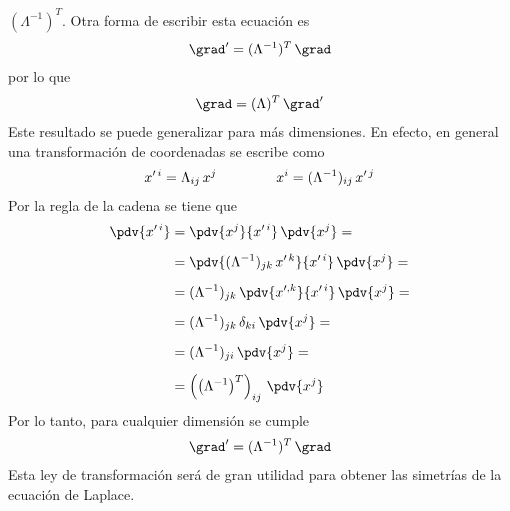 $(\Lambda^{-1})^{T}$. Otra forma de escribir esta ecuación es
\begin{align}
\grad^{\prime} = (\Lambda^{-1})^{T} \, \grad
\label{eq:ecuacion_10_014}
\end{align}
por lo que
\begin{align}
\grad = (\Lambda)^{T} \, \grad^{\prime}
\label{eq:ecuacion_10_015}
\end{align}
Este resultado se puede generalizar para más dimensiones. En efecto, en general una transformación de coordenadas se escribe como
\begin{align}
x^{\prime \, i} = \Lambda_{ij} \, x^{j} \hspace{1.5cm} x^{i} = (\Lambda^{-1})_{ij} \, x^{\prime \, j}
\label{eq:ecuacion_10_016}
\end{align}
Por la regla de la cadena se tiene que
\begin{align}
\pdv{x^{\prime \, i}} &= \pdv{x^{j}}{x^{\prime \, i}} \, \pdv{x^{j}} = \nonumber \\[0.5em]
&= \pdv{(\Lambda^{-1})_{jk} \, x^{\prime \, k}}{x^{\prime \, i}} \, \pdv{x^{j}} = \nonumber \\[0.5em]
&= (\Lambda^{-1})_{jk} \, \pdv{x^{\prime , k}}{x^{\prime \, i}} \, \pdv{x^{j}} = \nonumber \\[0.5em]
&= (\Lambda^{-1})_{jk} \, \delta_{ki} \, \pdv{x^{j}} = \nonumber \\[0.5em]
&= (\Lambda^{-1})_{ji} \, \pdv{x^{j}} = \nonumber \\[0.5em]
&= \left( \left( \Lambda^{-1} \right)^{T} \right)_{ij} \, \pdv{x^{j}}
\label{eq:ecuacion_10_017}
\end{align}
Por lo tanto, para cualquier dimensión se cumple
\begin{align}
\grad^{\prime} = (\Lambda^{-1})^{T} \, \grad
\label{eq:ecuacion_10_018}
\end{align}
Esta ley de transformación será de gran utilidad para obtener las simetrías de la ecuación de Laplace.

